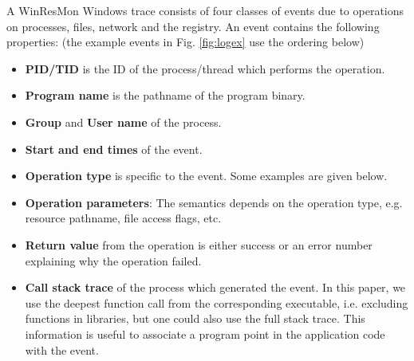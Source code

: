 A WinResMon Windows trace consists of four classes of events
due to operations on processes, files, network and the registry.
An event contains the following properties: (the example events
in Fig. \ref{fig:logex} use the ordering below)
\begin{itemize}
\item {\bf PID/TID} is the ID of the process/thread which 
performs the operation.
\item {\bf Program name} is the pathname of the program binary.
\item {\bf Group} and {\bf User name} of the process.
\item {\bf Start and end times} of the event.
\item {\bf Operation type} is specific to the event.
Some examples are given below.
\item {\bf Operation parameters}: The semantics depends on the operation type,
e.g.  resource pathname, file access flags, etc.
\item {\bf Return value} from the operation
is either success or an error number explaining why the operation failed.
\item {\bf Call stack trace} of the process which generated the event.
In this paper, we use the deepest function call 
from the corresponding executable, i.e. 
excluding functions in libraries,
but one could also use the full stack trace.
This information is useful to associate a program point in the
application code with the event.
\end{itemize}

